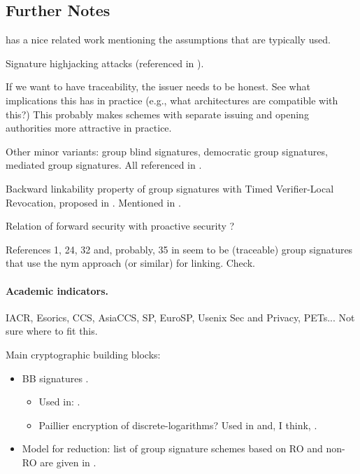 \subsection{Further Notes}


\cite{ehk+19} has a nice related work mentioning the assumptions that are
typically used.

Signature highjacking attacks (referenced in \cite{ehk+19}).

If we want to have traceability, the issuer needs to be honest. See what
implications this has in practice (e.g., what architectures are compatible
with this?) This probably makes schemes with separate issuing and opening
authorities more attractive in practice.

Other minor variants: group blind signatures, democratic group signatures,
mediated group signatures. All referenced in \cite[Section 1.3.5]{bsi12}.

Backward linkability property of group signatures with Timed Verifier-Local
Revocation, proposed in \cite{nf05}. Mentioned in \cite[Section 8.1.2]{bsi12}.

Relation of forward security with proactive security \cite{oy91}?

References 1, 24, 32 and, probably, 35 in \cite{bfg+11} seem to be (traceable)
group signatures that use the nym approach (or similar) for linking. Check.

\paragraph{Academic indicators.}
IACR, Esorics, CCS, AsiaCCS, SP, EuroSP, Usenix Sec and Privacy, PETs... Not
sure where to fit this.

Main cryptographic building blocks:

\begin{itemize}
\item BB signatures \cite{bb04}.
  \begin{itemize}
  \item Used in: \cite{ky05}.
  \item Paillier encryption of discrete-logarithms? Used in \cite{ky05} and,
    I think, \cite{gl19}.    
  \end{itemize}
\item Model for reduction: list of group signature schemes based on RO and
  non-RO are given in \cite{bcc+16}.
\end{itemize}

